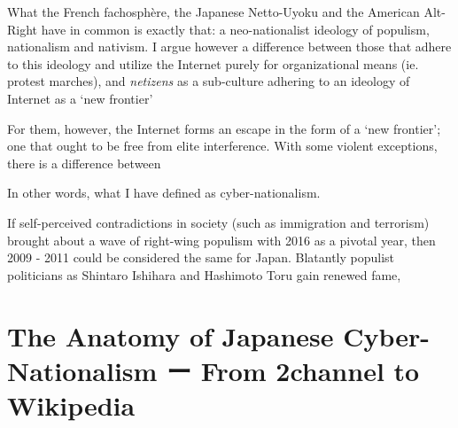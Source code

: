 \documentclass[10pt,british,A4paper,,openany]{memoir}
\begin{document}
What the French fachosphère, the Japanese Netto-Uyoku and the American
Alt-Right have in common is exactly that: a neo-nationalist ideology of
populism, nationalism and nativism. I argue however a difference between
those that adhere to this ideology and utilize the Internet purely for
organizational means (ie. protest marches), and \emph{netizens} as a
sub-culture adhering to an ideology of Internet as a `new frontier'

For them, however, the Internet forms an escape in the form of a `new
frontier'; one that ought to be free from elite interference. With some
violent exceptions, there is a difference between

In other words, what I have defined as cyber-nationalism.

If self-perceived contradictions in society (such as immigration and
terrorism) brought about a wave of right-wing populism with 2016 as a
pivotal year, then 2009 - 2011 could be considered the same for Japan.
Blatantly populist politicians as Shintaro Ishihara and Hashimoto Toru
gain renewed fame,

\chapter{The Anatomy of Japanese Cyber-Nationalism ー From 2channel to
Wikipedia}\label{the-anatomy-of-japanese-cyber-nationalism-ux30fc-from-2channel-to-wikipedia}
\end{document}
